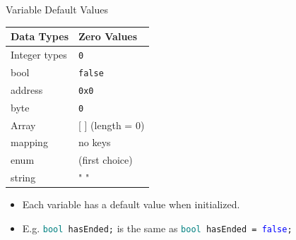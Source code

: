 \documentclass[handout]{beamer}
\begin{document}
\begin{frame}{Variable Default Values}

	\begin{table}
		\begin{tabular}{m{4cm} m{4cm}}
		\rowcolor{highlight}
			\hline
			Data Types & Zero Values\\
			\hline 
			\rowcolor{brightanthracite}
			Integer types & \texttt{0} \\
			bool &  \texttt{false} \\
			\rowcolor{brightanthracite}
			address & \texttt{0x0} \\
			byte & \texttt{0} \\
			\rowcolor{brightanthracite}
			Array & [ ] (length = 0) \\
			mapping & no keys \\
			\rowcolor{brightanthracite}
			enum & (first choice) \\
			string & " " \\
			\hline
		\end{tabular}
	\end{table}	

\begin{itemize}
		\item Each variable has a default value when initialized.
		\item E.g. \texttt{\textcolor{teal}{bool} hasEnded;} is the same as \texttt{\textcolor{teal}{bool} hasEnded = \textcolor{blue}{false};}
	\end{itemize}	
	
\end{frame}

\end{document}

